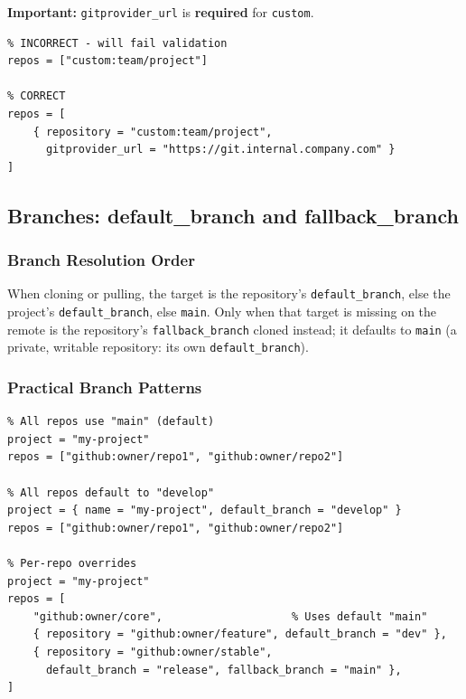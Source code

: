 \textbf{Important:} \texttt{gitprovider\_url} is \textbf{required} for \texttt{custom}.

\begin{lstlisting}
% INCORRECT - will fail validation
repos = ["custom:team/project"]

% CORRECT
repos = [
    { repository = "custom:team/project", 
      gitprovider_url = "https://git.internal.company.com" }
]
\end{lstlisting}

\subsection{Branches: default\_branch and fallback\_branch}
\label{subsec:cgs-branches}

\subsubsection{Branch Resolution Order}

When cloning or pulling, the target is the repository's
\texttt{default\_branch}, else the project's \texttt{default\_branch}, else
\texttt{main}. Only when that target is missing on the remote is the
repository's \texttt{fallback\_branch} cloned instead; it defaults to
\texttt{main} (a private, writable repository: its own
\texttt{default\_branch}).

\subsubsection{Practical Branch Patterns}

\begin{lstlisting}
% All repos use "main" (default)
project = "my-project"
repos = ["github:owner/repo1", "github:owner/repo2"]

% All repos default to "develop"
project = { name = "my-project", default_branch = "develop" }
repos = ["github:owner/repo1", "github:owner/repo2"]

% Per-repo overrides
project = "my-project"
repos = [
    "github:owner/core",                    % Uses default "main"
    { repository = "github:owner/feature", default_branch = "dev" },
    { repository = "github:owner/stable", 
      default_branch = "release", fallback_branch = "main" },
]
\end{lstlisting}

